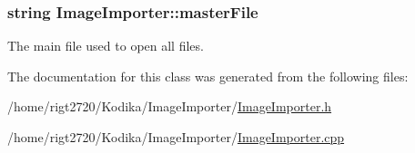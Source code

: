 \hypertarget{classImageImporter_ac525acb521f6790cd85877f828fac54c}{
\subsubsection[{master\-File}]{\setlength{\rightskip}{0pt plus 5cm}string Image\-Importer\-::master\-File\hspace{0.3cm}{\ttfamily [private]}}}\label{classImageImporter_ac525acb521f6790cd85877f828fac54c}


The main file used to open all files. 



The documentation for this class was generated from the following files\-:\begin{DoxyCompactItemize}
\item 
/home/rigt2720/\-Kodika/\-Image\-Importer/\hyperlink{ImageImporter_8h}{Image\-Importer.\-h}\item 
/home/rigt2720/\-Kodika/\-Image\-Importer/\hyperlink{ImageImporter_8cpp}{Image\-Importer.\-cpp}\end{DoxyCompactItemize}
